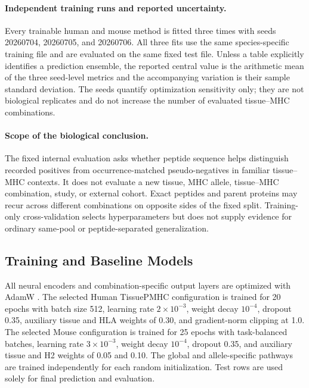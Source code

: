 \paragraph{Independent training runs and reported uncertainty.}
Every trainable human and mouse method is fitted three times with seeds 20260704, 20260705, and 20260706. All three fits use the same species-specific training file and are evaluated on the same fixed test file. Unless a table explicitly identifies a prediction ensemble, the reported central value is the arithmetic mean of the three seed-level metrics and the accompanying variation is their sample standard deviation. The seeds quantify optimization sensitivity only; they are not biological replicates and do not increase the number of evaluated tissue--MHC combinations.

\paragraph{Scope of the biological conclusion.}
The fixed internal evaluation asks whether peptide sequence helps distinguish recorded positives from occurrence-matched pseudo-negatives in familiar tissue--MHC contexts. It does not evaluate a new tissue, MHC allele, tissue--MHC combination, study, or external cohort. Exact peptides and parent proteins may recur across different combinations on opposite sides of the fixed split. Training-only cross-validation selects hyperparameters but does not supply evidence for ordinary same-pool or peptide-separated generalization.

\subsection{Training and Baseline Models}

All neural encoders and combination-specific output layers are optimized with AdamW \cite{loshchilov2019adamw}. The selected Human TissuePMHC configuration is trained for 20 epochs with batch size 512, learning rate \(2\times10^{-3}\), weight decay \(10^{-4}\), dropout 0.35, auxiliary tissue and HLA weights of 0.30, and gradient-norm clipping at 1.0. The selected Mouse configuration is trained for 25 epochs with task-balanced batches, learning rate \(3\times10^{-3}\), weight decay \(10^{-4}\), dropout 0.35, and auxiliary tissue and H2 weights of 0.05 and 0.10. The global and allele-specific pathways are trained independently for each random initialization. Test rows are used solely for final prediction and evaluation.

